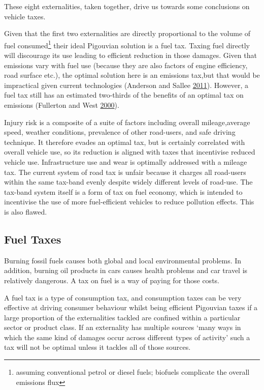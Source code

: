 \documentclass[]{tufte-handout}
\begin{document}
These eight externalities, taken together, drive us towards some
conclusions on vehicle taxes.

Given that the first two externalities are directly proportional to the
volume of fuel consumed\footnote{assuming conventional petrol or diesel
  fuels; biofuels complicate the overall emissions flux} their ideal
Pigouvian solution is a fuel tax. Taxing fuel directly will discourage
its use leading to efficient reduction in those damages. Given that
emissions vary with fuel use (because they are also factors of engine
efficiency, road surface etc.), the optimal solution here is an
emissions tax,but that would be impractical given current technologies
(Anderson and Sallee \protect\hyperlink{ref-Anderson2011}{2011}).
However, a fuel tax still has an estimated two-thirds of the benefits of
an optimal tax on emissions (Fullerton and West
\protect\hyperlink{ref-Fullerton2000}{2000}).

Injury risk is a composite of a suite of factors including overall
mileage,average speed, weather conditions, prevalence of other
road-users, and safe driving technique. It therefore evades an optimal
tax, but is certainly correlated with overall vehicle use, so its
reduction is aligned with taxes that incentivise reduced vehicle use.
Infrastructure use and wear is optimally addressed with a mileage tax.
The current system of road tax is unfair because it charges all
road-users within the same tax-band evenly despite widely different
levels of road-use. The tax-band system itself is a form of tax on fuel
economy, which is intended to incentivise the use of more fuel-efficient
vehicles to reduce pollution effects. This is also flawed.

\hypertarget{fuel-taxes}{%
\subsection{Fuel Taxes}\label{fuel-taxes}}

Burning fossil fuels causes both global and local environmental
problems. In addition, burning oil products in cars causes health
problems and car travel is relatively dangerous. A tax on fuel is a way
of paying for those costs.

A fuel tax is a type of consumption tax, and consumption taxes can be
very effective at driving consumer behaviour whilst being efficient
Pigouvian taxes if a large proportion of the externalities tackled are
confined within a particular sector or product class. If an externality
has multiple sources `many ways in which the same kind of damages occur
across different types of activity' such a tax will not be optimal
unless it tackles all of those sources.
\end{document}
